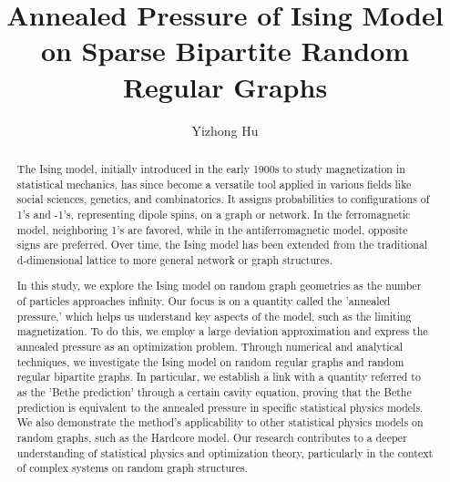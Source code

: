 \documentclass[12pt]{article}
\begin{document}
\title{Annealed Pressure of Ising Model on Sparse Bipartite Random Regular Graphs}
\author{Yizhong Hu}
\maketitle

\begin{abstract}
    The Ising model, initially introduced in the early 1900s to study magnetization in statistical mechanics, has since become a versatile tool applied in various fields like social sciences, genetics, and combinatorics. It assigns probabilities to configurations of 1's and -1's, representing dipole spins, on a graph or network. In the ferromagnetic model, neighboring 1's are favored, while in the antiferromagnetic model, opposite signs are preferred. Over time, the Ising model has been extended from the traditional d-dimensional lattice to more general network or graph structures.

    In this study, we explore the Ising model on random graph geometries as the number of particles approaches infinity. Our focus is on a quantity called the 'annealed pressure,' which helps us understand key aspects of the model, such as the limiting magnetization. To do this, we employ a large deviation approximation and express the annealed pressure as an optimization problem. Through numerical and analytical techniques, we investigate the Ising model on random regular graphs and random regular bipartite graphs. In particular, we establish a link with a quantity referred to as the 'Bethe prediction' through a certain cavity equation, proving that the Bethe prediction is equivalent to the annealed pressure in specific statistical physics models. We also demonstrate the method's applicability to other statistical physics models on random graphs, such as the Hardcore model. Our research contributes to a deeper understanding of statistical physics and optimization theory, particularly in the context of complex systems on random graph structures.
\end{abstract}
\end{document}
